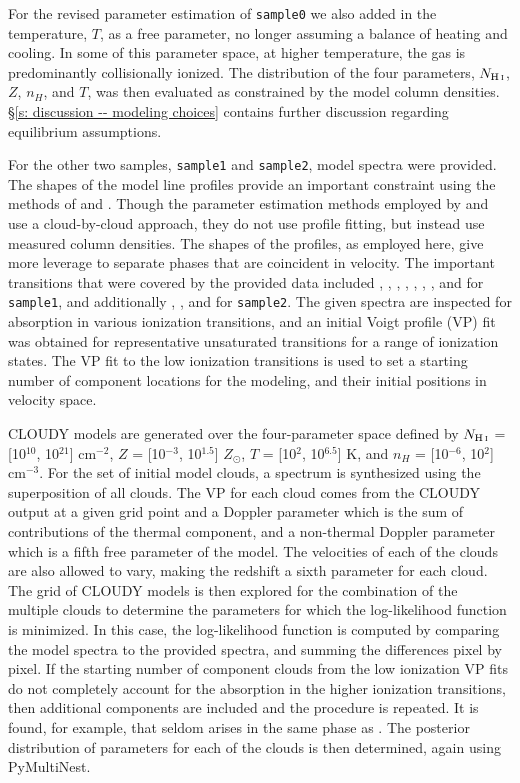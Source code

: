 \documentclass[fleqn,usenatbib]{mnras}
\begin{document}
For the revised parameter estimation of \texttt{sample0} we also added in the temperature, $T$, as a free parameter, no longer assuming a balance of heating and cooling.
In some of this parameter space, at higher temperature, the gas is predominantly collisionally ionized.
The distribution of the four parameters, $N_{\ion{H}{I}}$, $Z$, $n_H$, and $T$, was then evaluated as constrained by the model column densities.
\S\ref{s: discussion -- modeling choices} contains further discussion regarding equilibrium assumptions.

For the other two samples, \texttt{sample1} and \texttt{sample2}, model spectra were provided.
The shapes of the model line profiles provide an important constraint using the methods of \cite{sameer2021Cloudbycloud} and \cite{sameer2022Probing}.
Though the  parameter estimation methods employed by \cite{zahedy2019Probing} and \cite{haislmaier2021COS} use a cloud-by-cloud approach, they do not use profile fitting, but instead use measured column densities.
The shapes of the profiles, as employed here, give more leverage to separate phases that are coincident in velocity.
The important transitions that were covered by the provided  data included , , , , , , , and  for \texttt{sample1}, and additionally , , and  for \texttt{sample2}.
The given spectra are inspected for absorption in various ionization transitions, and an initial Voigt profile (VP) fit was obtained for representative unsaturated transitions for a range of ionization states.
The VP fit to the low ionization transitions is used to set a starting number of component locations for the modeling, and their initial positions in velocity space.

CLOUDY models are generated over the four-parameter space defined by $N_{\ion{H}{I}}$ = [10$^{10}$, 10$^{21}$] cm$^{-2}$, $Z$ = [10$^{-3}$, 10$^{1.5}$] $Z_\odot$, $T$ = [10$^{2}$, 10$^{6.5}$] K, and $n_H$ = [10$^{-6}$, 10$^{2}$] cm$^{-3}$.
For the set of initial model clouds, a spectrum is synthesized using the superposition of all clouds.
The VP for each cloud comes from the CLOUDY output at a given grid point and a Doppler parameter which is the sum of contributions of the thermal component, and a non-thermal Doppler parameter which is a fifth free parameter of the model.
The velocities of each of the clouds are also allowed to vary, making the redshift a sixth parameter for each cloud.
The grid of CLOUDY models is then explored for the combination of the multiple clouds to determine the parameters for which the log-likelihood function is minimized.
In this case, the log-likelihood function is computed by comparing the model spectra to the provided spectra, and summing the differences pixel by pixel.
If the starting number of component clouds from the low ionization VP fits do not completely account for the absorption in the higher ionization transitions, then additional components are included and the procedure is repeated.
It is found, for example, that  seldom arises in the same phase as .
The posterior distribution of parameters for each of the clouds is then determined, again using PyMultiNest.
\end{document}
